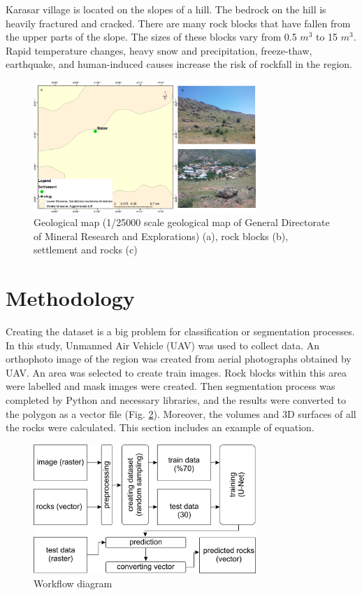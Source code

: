\documentclass[a4paper,fleqn]{cas-sc}
\begin{document}
Karasar village is located on the slopes of a hill. The bedrock on the hill is heavily fractured and cracked. There are many rock blocks that have fallen from the upper parts of the slope. The sizes of these blocks vary from 0.5 $m^3$ to 15 $m^3$. Rapid temperature changes, heavy snow and precipitation, freeze-thaw, earthquake, and human-induced causes increase the risk of rockfall in the region.
\begin{figure}
	\centering
	\includegraphics[width=0.75\textwidth]{figures/fig2.jpg}
	\caption{ Geological map (1/25000 scale geological map of General Directorate of Mineral Research and Explorations) (a), rock blocks (b), settlement and rocks (c)}
	\label{fig:Figure2}
\end{figure}

\section{Methodology}
Creating the dataset is a big problem for classification or segmentation processes. In this study, Unmanned Air Vehicle (UAV) was used to collect data. An orthophoto image of the region was created from aerial photographs obtained by UAV. An area was selected to create train images. Rock blocks within this area were labelled and mask images were created. Then segmentation process was completed by Python and necessary libraries, and the results were converted to the polygon as a vector file (Fig. \ref{fig:Figure3}). Moreover, the volumes and 3D surfaces of all the rocks were calculated.
This section includes an example of equation. 
\begin{figure}
	\centering
	\includegraphics[width=0.75\textwidth]{figures/fig3.jpg}
	\caption{ Workflow diagram}
	\label{fig:Figure3}
\end{figure}
\end{document}
